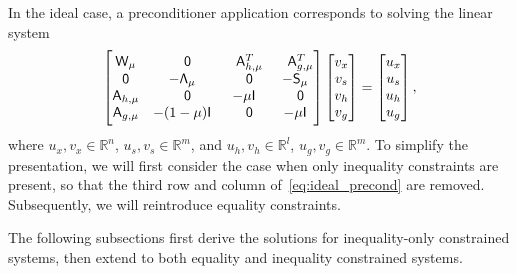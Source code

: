 In the ideal case, a preconditioner application corresponds to solving the
linear system
\begin{equation}\label{eq:ideal_precond}
  \begin{bmatrix} 
	\mathsf{W}_\mu & \phantom{-}\mathsf{0} & \phantom{-}\mathsf{A}_{h,\mu}^T  & \phantom{-}\mathsf{A}_{g,\mu}^T \\
	\mathsf{0}  & -\mathsf{\Lambda}_\mu & \phantom{-}\mathsf{0}   & -\mathsf{S}_\mu \\
	\mathsf{A}_{h, \mu} & \phantom{-}\mathsf{0} &  -\mu \mathsf{I} & \phantom{-}\mathsf{0}  \\
	\mathsf{A}_{g, \mu} &  -(1-\mu)\mathsf{I} &  \phantom{-}\mathsf{0}     &   -\mu \mathsf{I}
\end{bmatrix}
\begin{bmatrix} v_x \\ v_s \\ v_{h} \\  v_{g} \end{bmatrix} 
= 
\begin{bmatrix} u_x \\ u_s \\ u_{h} \\ u_{g}  \end{bmatrix},
\end{equation}
where $u_x, v_x \in \mathbb{R}^n$, $u_s, v_s \in \mathbb{R}^{m}$, and $u_h, v_h \in
\mathbb{R}^{l}$,  $u_g, v_g \in \mathbb{R}^{m}$.  To simplify the presentation, 
we will first consider the case when only inequality constraints are present, 
so that the third row and column of~\eqref{eq:ideal_precond} are removed.  
Subsequently, we will reintroduce equality constraints.


The following subsections first derive the 
solutions for inequality-only constrained systems, then extend to both equality and inequality 
constrained systems. 

